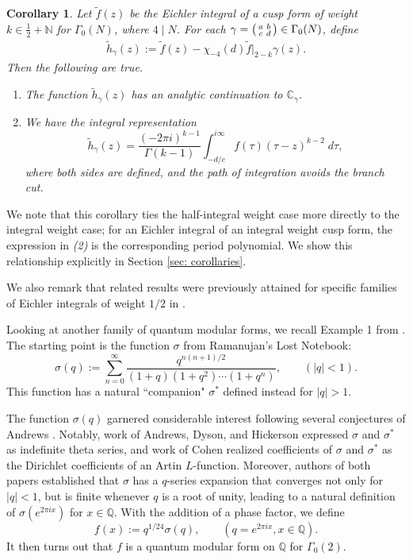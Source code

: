 \documentclass[12pt]{amsart}
\theoremstyle{definition}
\theoremstyle{plain}
\newtheorem{cor}[theorem]{Corollary}
\numberwithin{equation}{section}
\begin{document}
\begin{cor}\label{cor: eichler}
Let $\tilde{f}(z)$ be the Eichler integral of a cusp form of weight $k \in \frac{1}{2} + \mathbb{N}$ for $\Gamma_0(N)$, where $4 \mid N$. For each $\gamma =\begin{psmallmatrix} a & b \\ c & d \end{psmallmatrix} \in \Gamma_0(N)$, define
\begin{align*}
	\tilde{h}_\gamma(z):= \tilde{f}(z)  -  \chi_{-4}(d)\tilde{f}|_{2-k}\gamma(z). 
\end{align*}
	Then the following are true.
\begin{enumerate}
\item The function $\tilde{h}_\gamma(z)$ has an analytic continuation to $\mathbb{C}_\gamma$. 
\item We have the integral representation \[\displaystyle{\tilde{h}_\gamma(z) = \frac{(-2\pi i)^{k-1}}{\Gamma(k-1)} \int_{-d/c}^{i\infty} f(\tau)\left(\tau-z \right)^{k-2}\;d\tau},\] where both sides are defined, and the path of integration avoids the branch cut. 
\end{enumerate}
\end{cor}

We note that this corollary ties the half-integral weight case more directly to the integral weight case; for an Eichler integral of an integral weight cusp form, the expression in \emph{(2)} is the corresponding period polynomial. We show this relationship explicitly in Section \ref{sec: corollaries}. 

We also remark that related results were previously attained for specific families of Eichler integrals of weight $1/2$ in \cite{gukov-marino-putrov, andersen-mistegard, 3d-modularity, hanetal, bringmann-nazaroglu}.

Looking at another family of quantum modular forms, we recall Example 1 from \cite{zagier-quantum}. The starting point is the function $\sigma$ from Ramanujan's Lost Notebook:
\[\sigma(q) := \sum_{n=0}^\infty \frac{q^{n(n+1)/2}}{(1+q)(1+q^2)\cdots(1+q^n)}, \quad \quad (|q|<1). 
\]
This function has a natural ``companion" $\sigma^*$ defined instead for $|q|>1$. 

The function $\sigma(q)$ garnered considerable interest following several conjectures of Andrews \cite{andrews}. Notably, work of Andrews, Dyson, and Hickerson \cite{andrews-dyson-hickerson} expressed $\sigma$ and $\sigma^*$ as indefinite theta series, and work of Cohen \cite{cohen} realized coefficients of $\sigma$ and $\sigma^*$ as the Dirichlet coefficients of an Artin $L$-function. 
Moreover, authors of both papers established that $\sigma$ has a $q$-series expansion that converges not only for $|q|<1$, but is finite whenever $q$ is a root of unity, leading to a natural definition of $\sigma(e^{2\pi i x})$ for $x \in \mathbb{Q}$. With the addition of a phase factor, we define 
 \[f(x) := q^{1/24} \sigma(q), \quad \quad(q = e^{2\pi i x}, x\in \mathbb{Q}).\]
It then turns out that $f$ is a quantum modular form on $\mathbb{Q}$ for $\Gamma_0(2)$. 
\end{document}

